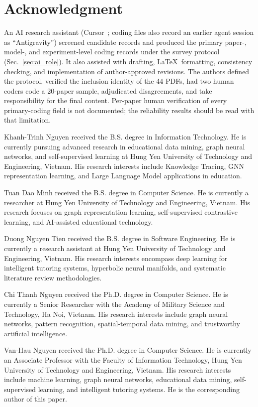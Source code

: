 \documentclass[lettersize,journal]{IEEEtran}
\begin{document}
\section*{Acknowledgment}
An AI research assistant (Cursor~\cite{Cursor_AI_2026}; coding files also record an earlier agent session as ``Antigravity'') screened candidate records and produced the primary paper-, model-, and experiment-level coding records under the survey protocol (Sec.~\ref{sec:ai_role}). It also assisted with drafting, \LaTeX\ formatting, consistency checking, and implementation of author-approved revisions. The authors defined the protocol, verified the inclusion identity of the 44 PDFs, had two human coders code a 20-paper sample, adjudicated disagreements, and take responsibility for the final content. Per-paper human verification of every primary-coding field is not documented; the reliability results should be read with that limitation.


\begin{IEEEbiographynophoto}{Khanh-Trinh Nguyen}
received the B.S. degree in Information Technology. He is currently pursuing advanced research in educational data mining, graph neural networks, and self-supervised learning at Hung Yen University of Technology and Engineering, Vietnam. His research interests include Knowledge Tracing, GNN representation learning, and Large Language Model applications in education.
\end{IEEEbiographynophoto}
\begin{IEEEbiographynophoto}{Tuan Dao Minh}
received the B.S. degree in Computer Science. He is currently a researcher at Hung Yen University of Technology and Engineering, Vietnam. His research focuses on graph representation learning, self-supervised contrastive learning, and AI-assisted educational technology.
\end{IEEEbiographynophoto}
\begin{IEEEbiographynophoto}{Duong Nguyen Tien}
received the B.S. degree in Software Engineering. He is currently a research assistant at Hung Yen University of Technology and Engineering, Vietnam. His research interests encompass deep learning for intelligent tutoring systems, hyperbolic neural manifolds, and systematic literature review methodologies.
\end{IEEEbiographynophoto}
\begin{IEEEbiographynophoto}{Chi Thanh Nguyen}
received the Ph.D. degree in Computer Science. He is currently a Senior Researcher with the Academy of Military Science and Technology, Ha Noi, Vietnam. His research interests include graph neural networks, pattern recognition, spatial-temporal data mining, and trustworthy artificial intelligence.
\end{IEEEbiographynophoto}
\begin{IEEEbiographynophoto}{Van-Hau Nguyen}
received the Ph.D. degree in Computer Science. He is currently an Associate Professor with the Faculty of Information Technology, Hung Yen University of Technology and Engineering, Vietnam. His research interests include machine learning, graph neural networks, educational data mining, self-supervised learning, and intelligent tutoring systems. He is the corresponding author of this paper.
\end{IEEEbiographynophoto}
\end{document}
